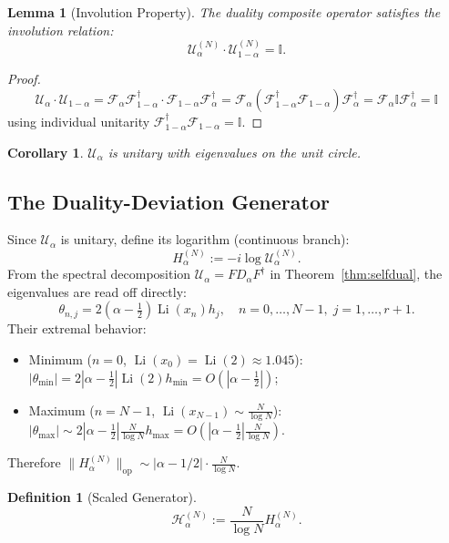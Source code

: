 \documentclass[12pt,a4paper]{amsart}
\theoremstyle{plain}
\newtheorem{lemma}[theorem]{Lemma}
\newtheorem{corollary}[theorem]{Corollary}
\theoremstyle{definition}
\newtheorem{definition}[theorem]{Definition}
\theoremstyle{remark}
\begin{document}
\begin{lemma}[Involution Property]\label{lem:involution}
The duality composite operator satisfies the involution relation:
\[
\mathcal{U}_\alpha^{(N)}\cdot\mathcal{U}_{1-\alpha}^{(N)}=\mathbb{I}.
\]
\end{lemma}

\begin{proof}
\[
\mathcal{U}_\alpha\cdot\mathcal{U}_{1-\alpha}=\mathcal{F}_\alpha\mathcal{F}_{1-\alpha}^{\dagger}\cdot\mathcal{F}_{1-\alpha}\mathcal{F}_\alpha^{\dagger}=\mathcal{F}_\alpha(\mathcal{F}_{1-\alpha}^{\dagger}\mathcal{F}_{1-\alpha})\mathcal{F}_\alpha^{\dagger}=\mathcal{F}_\alpha\mathbb{I}\mathcal{F}_\alpha^{\dagger}=\mathbb{I}
\]
using individual unitarity $\mathcal{F}_{1-\alpha}^{\dagger}\mathcal{F}_{1-\alpha}=\mathbb{I}$.
\end{proof}

\begin{corollary}\label{cor:unitary}
$\mathcal{U}_\alpha$ is unitary with eigenvalues on the unit circle.
\end{corollary}

\subsection{The Duality-Deviation Generator}

Since $\mathcal{U}_\alpha$ is unitary, define its logarithm (continuous branch):
\[
H_\alpha^{(N)} := -i \log \mathcal{U}_\alpha^{(N)}.
\]
From the spectral decomposition $\mathcal{U}_\alpha = F D_\alpha F^\dagger$ in Theorem~\ref{thm:selfdual}, the eigenvalues are read off directly:
\[
\theta_{n,j} = 2(\alpha-\tfrac12)\operatorname{Li}(x_n)h_j,\quad n=0,\dots,N-1,\;j=1,\dots,r+1.
\]
Their extremal behavior:
\begin{itemize}
\item Minimum ($n=0$, $\operatorname{Li}(x_0)=\operatorname{Li}(2)\approx 1.045$): $|\theta_{\min}| = 2|\alpha-\frac12|\operatorname{Li}(2)h_{\min}=O(|\alpha-\frac12|)$;
\item Maximum ($n=N-1$, $\operatorname{Li}(x_{N-1})\sim\frac{N}{\log N}$): $|\theta_{\max}| \sim 2|\alpha-\frac12|\frac{N}{\log N}h_{\max}=O(|\alpha-\frac12|\frac{N}{\log N})$.
\end{itemize}
Therefore $\|H_\alpha^{(N)}\|_{\mathrm{op}}\sim|\alpha-1/2|\cdot\frac{N}{\log N}$.

\begin{definition}[Scaled Generator]\label{def:scaled}
\[
\mathcal{H}_\alpha^{(N)} := \frac{N}{\log N} H_\alpha^{(N)}.
\]
\end{definition}
\end{document}
